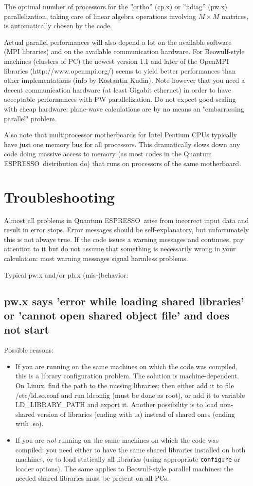 \documentclass[12pt,a4paper]{article}
\def\qe{{\sc Quantum ESPRESSO}}
\begin{document}
The optimal number of processors for the ''ortho'' (cp.x) or ''ndiag'' 
(pw.x) parallelization, taking care of linear algebra operations 
involving $M\times M$ matrices, is automatically chosen by the code.

Actual parallel performances will also depend a lot on the available software 
(MPI libraries) and on the available communication hardware. For
Beowulf-style machines (clusters of PC) the newest version 1.1 and later of 
the OpenMPI libraries (http://www.openmpi.org/) seems to yield better 
performances than other implementations (info by Kostantin Kudin). 
Note however that you need a decent communication hardware (at least 
Gigabit ethernet) in order to have acceptable performances with 
PW parallelization. Do not expect good scaling with cheap hardware: 
plane-wave calculations are by no means an "embarrassing parallel" problem.
   
Also note that multiprocessor motherboards for Intel Pentium CPUs typically 
have just one memory bus for all processors. This dramatically
slows down any code doing massive access to memory (as most codes 
in the \qe\ distribution do) that runs on processors of the same
motherboard.
\section{Troubleshooting}

Almost all problems in \qe\ arise from incorrect input data 
and result in
error stops. Error messages should be self-explanatory, but unfortunately
this is not always true. If the code issues a warning messages and continues,
pay attention to it but do not assume that something is necessarily wrong in
your calculation: most warning messages signal harmless problems.
    
Typical pw.x and/or ph.x (mis-)behavior:

\subsection{pw.x says 'error while loading shared libraries' or
  'cannot open shared object file' and does not start} 
Possible reasons:
\begin{itemize}
\item If you are running on the same machines on which the code was
  compiled, this is a library configuration problem. The solution is
  machine-dependent. On Linux, find the path to the missing libraries;
  then either add it to file /etc/ld.so.conf and run ldconfig (must be
  done as root), or add it to variable LD\_LIBRARY\_PATH and export
  it. Another possibility is to load non-shared version of libraries
  (ending with .a)  instead of shared ones (ending with .so). 
\item If you are {\em not} running on the same machines on which the
  code was compiled: you need either to have the same shared libraries
  installed on both machines, or to load statically all libraries
  (using appropriate \texttt{configure} or loader options). The same applies to
  Beowulf-style parallel machines: the needed shared libraries must be
  present on all PCs. 
\end{itemize}
\end{document}
